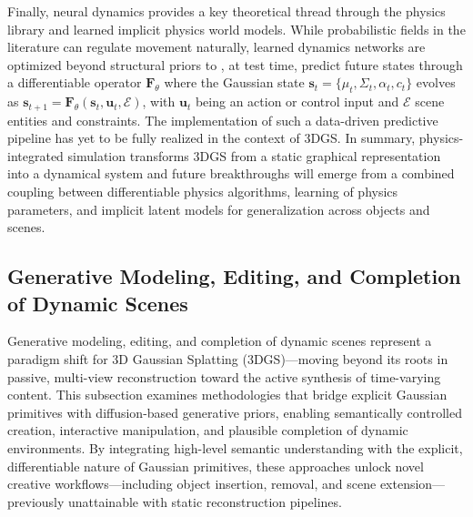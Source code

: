 \documentclass[11pt,a4paper]{article}
\begin{document}
Finally, neural dynamics provides a key theoretical thread through the physics library and learned implicit physics world models. While probabilistic fields in the literature can regulate movement naturally, learned dynamics networks are optimized beyond structural priors to , at test time, predict future states through a differentiable operator \(\mathbf{F}_\theta\) where the Gaussian state \(\mathbf{s}_t=\{\mu_t,\Sigma_t,\alpha_t,c_t\}\) evolves as \(\mathbf{s}_{t+1}=\mathbf{F}_\theta(\mathbf{s}_t,\mathbf{u}_t,\mathcal{E})\), with \(\mathbf{u}_t\) being an action or control input and \(\mathcal{E}\) scene entities and constraints. The implementation of such a data-driven predictive pipeline has yet to be fully realized in the context of 3DGS. In summary, physics-integrated simulation transforms 3DGS from a static graphical representation into a dynamical system and future breakthroughs will emerge from a combined coupling between differentiable physics algorithms, learning of physics parameters, and implicit latent models for generalization across objects and scenes.


\subsection{Generative Modeling, Editing, and Completion of Dynamic Scenes}


Generative modeling, editing, and completion of dynamic scenes represent a paradigm shift for 3D Gaussian Splatting (3DGS)---moving beyond its roots in passive, multi-view reconstruction toward the active synthesis of time-varying content. This subsection examines methodologies that bridge explicit Gaussian primitives with diffusion-based generative priors, enabling semantically controlled creation, interactive manipulation, and plausible completion of dynamic environments. By integrating high-level semantic understanding with the explicit, differentiable nature of Gaussian primitives, these approaches unlock novel creative workflows---including object insertion, removal, and scene extension---previously unattainable with static reconstruction pipelines.
\end{document}
